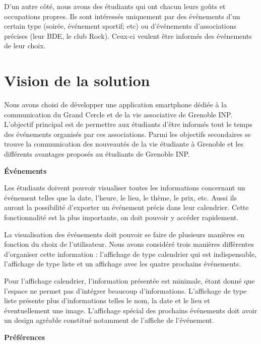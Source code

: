 \documentclass[a4paper, 11px]{article}
\begin{document}
D'un autre côté, nous avons des étudiants qui ont chacun leurs goûts et occupations propres. Ils sont intéressés uniquement par des événements d'un certain type (soirée, événement sportif; etc) ou d'événements d'associations précises (leur BDE, le club Rock). Ceux-ci veulent être informés des événements de leur choix.

\newpage

\section{Vision de la solution}

Nous avons choisi de développer une application smartphone dédiée à la communication du Grand Cercle et de la vie associative de Grenoble INP. L'objectif principal est de permettre aux étudiants d'être informés tout le temps des événements organisés par ces associations. Parmi les objectifs secondaires se trouve la communication des nouveautés de la vie étudiante à Grenoble et les différents avantages proposés au étudiants de Grenoble INP.

\vspace{.3cm}

 \textbf {\large Événements}

Les étudiants doivent pouvoir visualiser toutes les informations concernant un événement telles que la date, l'heure, le lieu, le thème, le prix, etc. Aussi ils auront la possibilité d'exporter un événement précis dans leur calendrier. Cette fonctionnalité est la plus importante, on doit pouvoir y accéder rapidement. 

La visualisation des événements doit pouvoir se faire de plusieurs manières en fonction du choix de l'utilisateur. Nous avons considéré trois manières différentes d'organiser cette information : l'affichage de type calendrier qui est indispensable, l'affichage de type liste et un affichage avec les quatre prochains événements.

Pour l'affichage calendrier, l'information présentée est minimale, étant donné que l'espace ne permet pas d'intégrer beaucoup d'informations. L'affichage de type liste présente plus d'informations telles le nom, la date et le lieu et éventuellement une image. L'affichage spécial des prochains événements doit avoir un design agréable constitué notamment de l'affiche de l'événement.

\vspace{.3cm}

 \textbf {\large Préférences}
\end{document}
